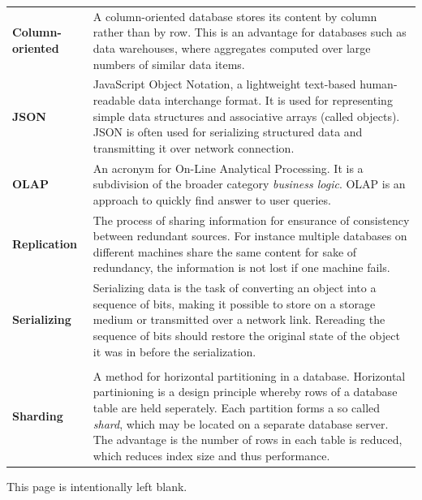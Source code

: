 \begin{tabular}[t]{lp{100mm}}
\textbf{Column-oriented} &
A column-oriented database stores its content by column rather than by row.
This is an advantage for databases such as data warehouses, where aggregates
computed over large numbers of similar data items.

 \\

\textbf{JSON} &
JavaScript Object Notation, a lightweight text-based human-readable data
interchange format. It is used for representing simple data structures and
associative arrays (called objects). JSON is often used for serializing
structured data and transmitting it over network connection.

 \\

\textbf{OLAP} &
An acronym for On-Line Analytical Processing. It is a subdivision of the broader
category \textit{business logic}. OLAP is an approach to quickly find answer to
user queries.

 \\

\textbf{Replication} &
The process of sharing information for ensurance of consistency between
redundant sources. For instance multiple databases on different machines share
the same content for sake of redundancy, the information is not lost if one
machine fails.

 \\

\textbf{Serializing} &
Serializing data is the task of converting an object into a sequence of bits,
making it possible to store on a storage medium or transmitted over a network
link. Rereading the sequence of bits should restore the original state of the
object it was in before the serialization. \\

 \\

\textbf{Sharding} &
A method for horizontal partitioning in a database. Horizontal partinioning is a
design principle whereby rows of a database table are held seperately. Each
partition forms a so called \textit{shard}, which may be located on a separate
database server. The advantage is the number of rows in each table is reduced,
which reduces index size and thus performance.
\end{tabular}


\pagebreak
This page is intentionally left blank.
\pagebreak


